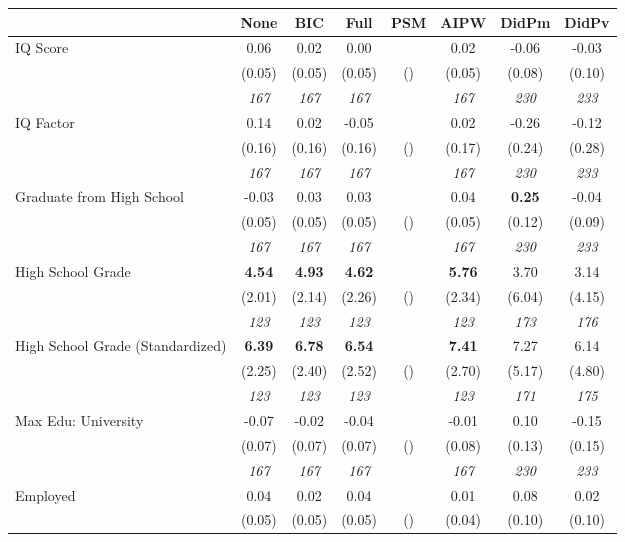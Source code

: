 \begin{tabular}{l c c c c c c c}
\toprule
 & None & BIC & Full & PSM & AIPW & DidPm & DidPv \\
\midrule
IQ Score & 0.06 & 0.02 & 0.00 & & 0.02 & -0.06 & -0.03 \\
& (0.05) & (0.05) & (0.05) & () & (0.05) & (0.08) & (0.10) \\
& \textit{ 167 } & \textit{ 167 } & \textit{ 167 } & & \textit{ 167 } & \textit{ 230 } & \textit{ 233 } \\
IQ Factor & 0.14 & 0.02 & -0.05 & & 0.02 & -0.26 & -0.12 \\
& (0.16) & (0.16) & (0.16) & () & (0.17) & (0.24) & (0.28) \\
& \textit{ 167 } & \textit{ 167 } & \textit{ 167 } & & \textit{ 167 } & \textit{ 230 } & \textit{ 233 } \\
Graduate from High School & -0.03 & 0.03 & 0.03 & & 0.04 & \textbf{ 0.25 } & -0.04 \\
& (0.05) & (0.05) & (0.05) & () & (0.05) & (0.12) & (0.09) \\
& \textit{ 167 } & \textit{ 167 } & \textit{ 167 } & & \textit{ 167 } & \textit{ 230 } & \textit{ 233 } \\
High School Grade & \textbf{ 4.54 } & \textbf{ 4.93 } & \textbf{ 4.62 } & & \textbf{5.76} & 3.70 & 3.14 \\
& (2.01) & (2.14) & (2.26) & () & (2.34) & (6.04) & (4.15) \\
& \textit{ 123 } & \textit{ 123 } & \textit{ 123 } & & \textit{ 123 } & \textit{ 173 } & \textit{ 176 } \\
High School Grade (Standardized) & \textbf{ 6.39 } & \textbf{ 6.78 } & \textbf{ 6.54 } & & \textbf{7.41} & 7.27 & 6.14 \\
& (2.25) & (2.40) & (2.52) & () & (2.70) & (5.17) & (4.80) \\
& \textit{ 123 } & \textit{ 123 } & \textit{ 123 } & & \textit{ 123 } & \textit{ 171 } & \textit{ 175 } \\
Max Edu: University & -0.07 & -0.02 & -0.04 & & -0.01 & 0.10 & -0.15 \\
& (0.07) & (0.07) & (0.07) & () & (0.08) & (0.13) & (0.15) \\
& \textit{ 167 } & \textit{ 167 } & \textit{ 167 } & & \textit{ 167 } & \textit{ 230 } & \textit{ 233 } \\
Employed & 0.04 & 0.02 & 0.04 & & 0.01 & 0.08 & 0.02 \\
& (0.05) & (0.05) & (0.05) & () & (0.04) & (0.10) & (0.10) \\

\end{tabular}
